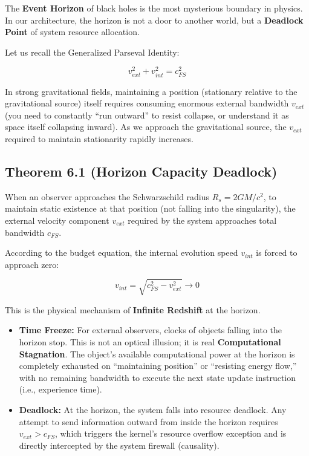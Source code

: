\documentclass[11pt,a4paper,twoside]{book}
\begin{document}
The \textbf{Event Horizon} of black holes is the most mysterious boundary in physics. In our architecture, the horizon is not a door to another world, but a \textbf{Deadlock Point} of system resource allocation.

Let us recall the Generalized Parseval Identity:

$$v_{ext}^2 + v_{int}^2 = c_{FS}^2$$

In strong gravitational fields, maintaining a position (stationary relative to the gravitational source) itself requires consuming enormous external bandwidth \textbf{$v_{ext}$} (you need to constantly ``run outward'' to resist collapse, or understand it as space itself collapsing inward). As we approach the gravitational source, the \textbf{$v_{ext}$} required to maintain stationarity rapidly increases.

\subsection{Theorem 6.1 (Horizon Capacity Deadlock)}

When an observer approaches the Schwarzschild radius \textbf{$R_s = 2GM/c^2$}, to maintain static existence at that position (not falling into the singularity), the external velocity component \textbf{$v_{ext}$} required by the system approaches total bandwidth \textbf{$c_{FS}$}.

According to the budget equation, the internal evolution speed \textbf{$v_{int}$} is forced to approach zero:

$$v_{int} = \sqrt{c_{FS}^2 - v_{ext}^2} \to 0$$

This is the physical mechanism of \textbf{Infinite Redshift} at the horizon.

\begin{itemize}
\item \textbf{Time Freeze:} For external observers, clocks of objects falling into the horizon stop. This is not an optical illusion; it is real \textbf{Computational Stagnation}. The object's available computational power at the horizon is completely exhausted on ``maintaining position'' or ``resisting energy flow,'' with no remaining bandwidth to execute the next state update instruction (i.e., experience time).

\item \textbf{Deadlock:} At the horizon, the system falls into resource deadlock. Any attempt to send information outward from inside the horizon requires \textbf{$v_{ext} > c_{FS}$}, which triggers the kernel's resource overflow exception and is directly intercepted by the system firewall (causality).
\end{itemize}
\end{document}
